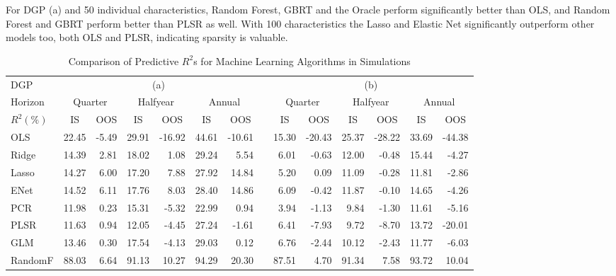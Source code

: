 \documentclass[11pt]{article}
\begin{document}
For DGP (a) and 50 individual characteristics, Random Forest, GBRT and the Oracle perform significantly better than OLS, and Random Forest and GBRT perform better than PLSR as well. With 100 characteristics the Lasso and Elastic Net significantly outperform other models too, both OLS and PLSR, indicating sparsity is valuable.

\begin{table}[ht]
\begin{threeparttable}
\centering
\setlength{\tabcolsep}{5pt}
\caption{Comparison of Predictive $R^2$s for Machine Learning Algorithms in Simulations}
\begin{tabular}{lrrrrrrcrrrrrr}
DGP & \multicolumn{6}{c}{(a)} && \multicolumn{6}{c}{(b)} \\
  \Xhline{2\arrayrulewidth}\noalign{\smallskip}
Horizon & \multicolumn{2}{c}{Quarter} & \multicolumn{2}{c}{Halfyear} & \multicolumn{2}{c}{Annual} && \multicolumn{2}{c}{Quarter} & \multicolumn{2}{c}{Halfyear} & \multicolumn{2}{c}{Annual} \\ 
   \noalign{\smallskip}\hline\noalign{\smallskip}
$R^2(\%)$ & \multicolumn{1}{c}{IS} & \multicolumn{1}{c}{OOS} & \multicolumn{1}{c}{IS} & \multicolumn{1}{c}{OOS} &\multicolumn{1}{c}{IS} & \multicolumn{1}{c}{OOS} && \multicolumn{1}{c}{IS} & \multicolumn{1}{c}{OOS} &\multicolumn{1}{c}{IS} & \multicolumn{1}{c}{OOS} & \multicolumn{1}{c}{IS} & \multicolumn{1}{c}{OOS}\\ 
  \noalign{\smallskip}\hline\noalign{\smallskip}
OLS & 22.45 & -5.49 & 29.91 & -16.92 & 44.61 & -10.61 && 15.30 & -20.43 & 25.37 & -28.22 & 33.69 & -44.38 \\ 
Ridge & 14.39 & 2.81 & 18.02 & 1.08 & 29.24 & 5.54 && 6.01 & -0.63 & 12.00 & -0.48 & 15.44 & -4.27 \\ 
Lasso & 14.27 & 6.00 & 17.20 & 7.88 & 27.92 & 14.84 && 5.20 & 0.09 & 11.09 & -0.28 & 11.81 & -2.86 \\ 
ENet & 14.52 & 6.11 & 17.76 & 8.03 & 28.40 & 14.86 && 6.09 & -0.42 & 11.87 & -0.10 & 14.65 & -4.26 \\ 
PCR & 11.98 & 0.23 & 15.31 & -5.32 & 22.99 & 0.94 && 3.94 & -1.13 & 9.84 & -1.30 & 11.61 & -5.16 \\ 
PLSR & 11.63 & 0.94 & 12.05 & -4.45 & 27.24 & -1.61 && 6.41 & -7.93 & 9.72 & -8.70 & 13.72 & -20.01 \\ 
GLM & 13.46 & 0.30 & 17.54 & -4.13 & 29.03 & 0.12 && 6.76 & -2.44 & 10.12 & -2.43 & 11.77 & -6.03 \\ 
RandomF & 88.03 & 6.64 & 91.13 & 10.27 & 94.29 & 20.30 && 87.51 & 4.70 & 91.34 & 7.58 & 93.72 & 10.04 \\ 

\end{tabular}
\end{threeparttable}
\end{table}
\end{document}
